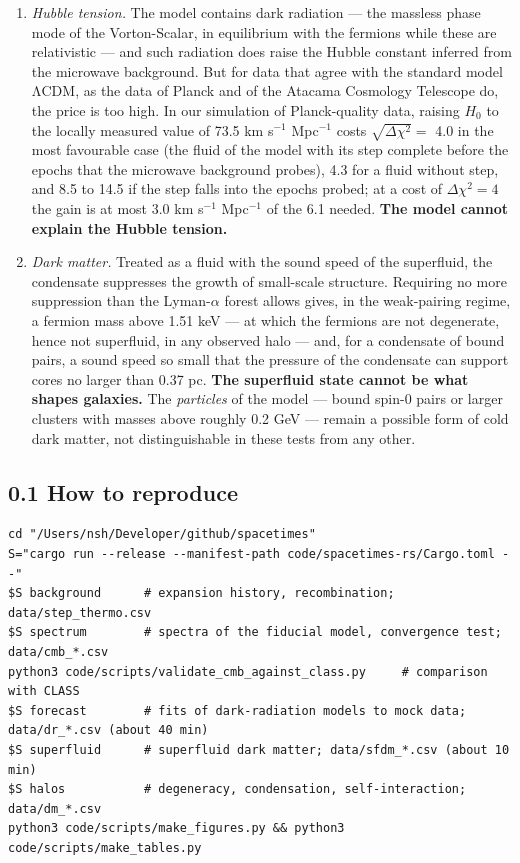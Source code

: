 \documentclass[
  10pt,
]{article}
\providecommand{\tightlist}{%
  \setlength{\itemsep}{0pt}\setlength{\parskip}{0pt}}
\begin{document}
\begin{enumerate}
\def\labelenumi{\arabic{enumi}.}
\tightlist
\item
  \emph{Hubble tension.} The model contains dark radiation --- the
  massless phase mode of the Vorton-Scalar, in equilibrium with the
  fermions while these are relativistic --- and such radiation does
  raise the Hubble constant inferred from the microwave background. But
  for data that agree with the standard model ΛCDM, as the data of
  Planck and of the Atacama Cosmology Telescope do, the price is too
  high. In our simulation of Planck-quality data, raising \(H_0\) to the
  locally measured value of 73.5 km s\(^{-1}\) Mpc\(^{-1}\) costs
  \(\sqrt{\Delta\chi^2}=\) 4.0 in the most favourable case (the fluid of
  the model with its step complete before the epochs that the microwave
  background probes), 4.3 for a fluid without step, and 8.5 to 14.5 if
  the step falls into the epochs probed; at a cost of \(\Delta\chi^2=4\)
  the gain is at most 3.0 km s\(^{-1}\) Mpc\(^{-1}\) of the 6.1 needed.
  \textbf{The model cannot explain the Hubble tension.}
\item
  \emph{Dark matter.} Treated as a fluid with the sound speed of the
  superfluid, the condensate suppresses the growth of small-scale
  structure. Requiring no more suppression than the Lyman-\(\alpha\)
  forest allows gives, in the weak-pairing regime, a fermion mass above
  1.51 keV --- at which the fermions are not degenerate, hence not
  superfluid, in any observed halo --- and, for a condensate of bound
  pairs, a sound speed so small that the pressure of the condensate can
  support cores no larger than 0.37 pc. \textbf{The superfluid state
  cannot be what shapes galaxies.} The \emph{particles} of the model ---
  bound spin-0 pairs or larger clusters with masses above roughly 0.2
  GeV --- remain a possible form of cold dark matter, not
  distinguishable in these tests from any other.
\end{enumerate}

\hypertarget{how-to-reproduce}{%
\subsection{0.1 How to reproduce}\label{how-to-reproduce}}

\begin{verbatim}
cd "/Users/nsh/Developer/github/spacetimes"
S="cargo run --release --manifest-path code/spacetimes-rs/Cargo.toml --"
$S background      # expansion history, recombination; data/step_thermo.csv
$S spectrum        # spectra of the fiducial model, convergence test; data/cmb_*.csv
python3 code/scripts/validate_cmb_against_class.py     # comparison with CLASS
$S forecast        # fits of dark-radiation models to mock data; data/dr_*.csv (about 40 min)
$S superfluid      # superfluid dark matter; data/sfdm_*.csv (about 10 min)
$S halos           # degeneracy, condensation, self-interaction; data/dm_*.csv
python3 code/scripts/make_figures.py && python3 code/scripts/make_tables.py
\end{verbatim}
\end{document}
